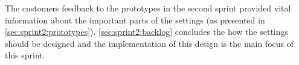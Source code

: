 The customers feedback to the prototypes in the second sprint provided vital information about the important parts of the settings (as presented in \cref{sec:sprint2:prototypes}).
\cref{sec:sprint2:backlog} concludes the how the settings should be designed and the implementation of this design is the main focus of this sprint.